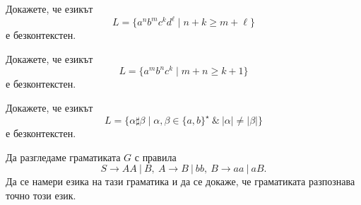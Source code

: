 \begin{problem}
  Докажете, че езикът 
  \[L = \{a^nb^mc^kd^\ell \mid n+k \geq m + \ell\}\]
  е безконтекстен.
\end{problem}

\begin{problem}
  Докажете, че езикът 
  \[L = \{a^mb^nc^k\mid m+n \geq k + 1\}\]
  е безконтекстен.  
\end{problem}

\begin{problem}
  Докажете, че езикът
  \[L = \{\alpha \sharp \beta \mid \alpha,\beta \in \{a,b\}^\star\ \&\ |\alpha| \neq |\beta| \}\]
  е безконтекстен.
\end{problem}

\begin{problem}
  Да разгледаме граматиката $G$ с правила
  \[S \to AA\ |\ B,\ A \to B\ |\ bb,\ B \to aa\ |\ aB.\]
  Да се намери езика на тази граматика и да се докаже, че граматиката разпознава точно този език.
\end{problem}

